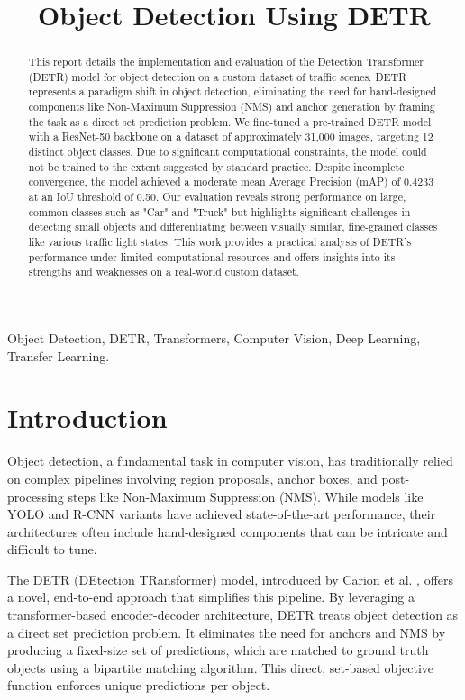 \documentclass[10pt, conference]{IEEEtran}
\title{Object Detection Using DETR}
\author{
\IEEEauthorblockN{Kodavali Purnendra Sri Krishnaditya}
\IEEEauthorblockA{23125017}
\and
\IEEEauthorblockN{Gunta Preetham}
\IEEEauthorblockA{23125013}


}
\begin{document}
\maketitle

\begin{abstract}
This report details the implementation and evaluation of the Detection Transformer (DETR) model for object detection on a custom dataset of traffic scenes. DETR represents a paradigm shift in object detection, eliminating the need for hand-designed components like Non-Maximum Suppression (NMS) and anchor generation by framing the task as a direct set prediction problem. We fine-tuned a pre-trained DETR model with a ResNet-50 backbone on a dataset of approximately 31,000 images, targeting 12 distinct object classes. Due to significant computational constraints, the model could not be trained to the extent suggested by standard practice. Despite incomplete convergence, the model achieved a moderate mean Average Precision (mAP) of 0.4233 at an IoU threshold of 0.50. Our evaluation reveals strong performance on large, common classes such as "Car" and "Truck" but highlights significant challenges in detecting small objects and differentiating between visually similar, fine-grained classes like various traffic light states. This work provides a practical analysis of DETR's performance under limited computational resources and offers insights into its strengths and weaknesses on a real-world custom dataset.
\end{abstract}

\begin{IEEEkeywords}
Object Detection, DETR, Transformers, Computer Vision, Deep Learning, Transfer Learning.
\end{IEEEkeywords}

\IEEEpeerreviewmaketitle

\section{Introduction}
Object detection, a fundamental task in computer vision, has traditionally relied on complex pipelines involving region proposals, anchor boxes, and post-processing steps like Non-Maximum Suppression (NMS). While models like YOLO and R-CNN variants have achieved state-of-the-art performance, their architectures often include hand-designed components that can be intricate and difficult to tune.

The DETR (DEtection TRansformer) model, introduced by Carion et al. \cite{carion2020end}, offers a novel, end-to-end approach that simplifies this pipeline. By leveraging a transformer-based encoder-decoder architecture, DETR treats object detection as a direct set prediction problem. It eliminates the need for anchors and NMS by producing a fixed-size set of predictions, which are matched to ground truth objects using a bipartite matching algorithm. This direct, set-based objective function enforces unique predictions per object.
\end{document}
